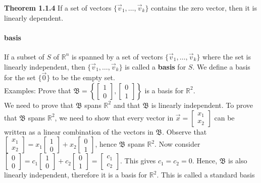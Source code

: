 \documentclass[10pt,letter]{article}
\begin{document}
\textbf{Theorem 1.1.4} If a set of vectors $\{\vec{v}_1,\ldots,\vec{v}_k\}$ contains the zero vector, then it is linearly dependent. \\ 

\paragraph{basis}If a subset of $S$ of $\mathbb{R}^n$ is spanned by a set of vectors $\{\vec{v}_1,\ldots,\vec{v}_k\}$ where the set is linearly independent, then $\{\vec{v}_1,\ldots,\vec{v}_k\}$ is called a \textbf{basis} for $S$. We define a basis for the set $\{\vec{0}\}$ to be the empty set. \\
Examples: Prove that $\mathfrak{B}=\left\{\begin{bmatrix}1\\0\end{bmatrix}, \begin{bmatrix}0\\1\end{bmatrix}\right\}$ is a basis for $\mathbb{R}^2$. \\ 
We need to prove that $\mathfrak{B}$ spans $\mathbb{R}^2$ and that $\mathfrak{B}$ is linearly independent. To prove that $\mathfrak{B}$ spans $\mathbb{R}^2$, we need to show that every vector in $\vec{x} = \begin{bmatrix}x_1\\x_2\end{bmatrix}$ can be written as a linear combination of the vectors in $\mathfrak{B}$. Observe that $\begin{bmatrix}x_1\\x_2\end{bmatrix} = x_1\begin{bmatrix}1\\0\end{bmatrix}+x_2\begin{bmatrix}0\\1\end{bmatrix}$, hence $\mathfrak{B}$ spans $\mathbb{R}^2$. Now consider $\begin{bmatrix}0\\0\end{bmatrix}=c_1\begin{bmatrix}1\\0\end{bmatrix}+c_2\begin{bmatrix}0\\1\end{bmatrix}=\begin{bmatrix}c_1\\c_2\end{bmatrix}$. This gives $c_1=c_2=0$. Hence, $\mathfrak{B}$ is also linearly independent, therefore it is a basis for $\mathbb{R}^2$. This is called a standard basis \\ 
\end{document}
